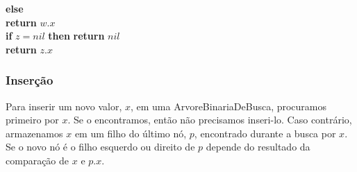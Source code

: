 \documentclass{beamer}
\begin{document}
\begin{frame}[shrink]
\begin{oframed}
\begin{flushleft}
\hspace*{1em} \hspace*{1em} \hspace*{1em} {\color{black} \textbf{else}} \\
\hspace*{1em} \hspace*{1em} \hspace*{1em} \hspace*{1em} {\color{black} \textbf{return}} \ensuremath{\ensuremath{\mathit{w}}.\ensuremath{\mathit{x}}}\\
\hspace*{1em} \hspace*{1em} {\color{black} \textbf{if}} \ensuremath{\ensuremath{\mathit{z}} = nil} {\color{black} \textbf{then}}  {\color{black} \textbf{return}} \ensuremath{nil} \\
\hspace*{1em} \hspace*{1em} {\color{black} \textbf{return}} \ensuremath{\ensuremath{\mathit{z}}.\ensuremath{\mathit{x}}}\\
\end{flushleft}
\end{oframed}

\end{frame}

\begin{frame}
\frametitle{Inserção}
Para inserir um novo valor, \ensuremath{\ensuremath{\ensuremath{\mathit{x}}}}, em uma ArvoreBinariaDeBusca, procuramos primeiro por \ensuremath{\ensuremath{\ensuremath{\mathit{x}}}}. Se o encontramos, então não precisamos inseri-lo.  Caso contrário, armazenamos \ensuremath{\ensuremath{\ensuremath{\mathit{x}}}} em um filho do último nó, \ensuremath{\ensuremath{\ensuremath{\mathit{p}}}}, encontrado durante a busca por \ensuremath{\ensuremath{\ensuremath{\mathit{x}}}}. Se o novo nó é o filho esquerdo ou direito de \ensuremath{\ensuremath{\ensuremath{\mathit{p}}}} depende do resultado da comparação de \ensuremath{\ensuremath{\ensuremath{\mathit{x}}}} e \ensuremath{\ensuremath{\ensuremath{\mathit{p}}.\ensuremath{\mathit{x}}}}.
\end{frame}
\end{document}
